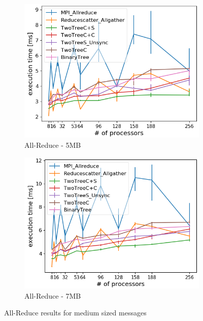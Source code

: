 \documentclass[sigplan,review,anonymous]{acmart}\settopmatter{printfolios=true,printccs=false,printacmref=false}
\begin{document}
\begin{figure}
\centering
\begin{subfigure}{.25\textwidth}
  \centering
  \includegraphics[width=1\linewidth]{images/Results/AllReduce/Allreduce_comp2_5242880B.png}
  \caption{All-Reduce - 5MB}
  \label{reduce-selected-5MB}
\end{subfigure}%
\begin{subfigure}{.25\textwidth}
  \centering
  \includegraphics[width=1\linewidth]{images/Results/AllReduce/Allreduce_comp2_7340032B.png}
  \caption{All-Reduce - 7MB}
  \label{reduce-selected-7MB}
\end{subfigure}
\caption{All-Reduce results for medium sized messages}
\label{graph-reduce-medium2-selected}
\end{figure}
\end{document}
